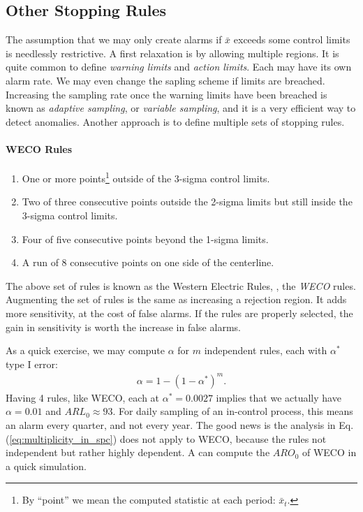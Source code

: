 \subsection{Other Stopping Rules}
\label{sec:stopping_rules}

The assumption that we may only create alarms if $\bar{x}$ exceeds some control limits is needlessly restrictive.
A first relaxation is by allowing multiple regions.
It is quite common to define \emph{warning limits} and \emph{action limits}. Each may have its own alarm rate.
We may even change the sapling scheme if limits are breached. Increasing the sampling rate once the warning limits have been breached is known as \emph{adaptive sampling}, or \emph{variable sampling}, and it is a very efficient way to detect anomalies. 
Another approach is to define multiple sets of stopping rules.
\begin{tcolorbox}[breakable]
\paragraph{WECO Rules}
\begin{enumerate}
\item One or more points\footnote{By ``point'' we mean the computed statistic at each period: $\bar{x}_t$.} outside of the 3-sigma control limits.
\item Two of three consecutive points outside the 2-sigma limits but still inside the 3-sigma control limits.
\item Four of five consecutive points beyond the 1-sigma limits.
\item A run of 8 consecutive points on one side of the centerline.
\end{enumerate}
\end{tcolorbox}

The above set of rules is known as the Western Electric Rules, \aka, the \emph{WECO} rules.
Augmenting the set of rules is the same as increasing a rejection region. It adds more sensitivity, at the cost of false alarms. If the rules are properly selected, the gain in sensitivity is worth the increase in false alarms.

As a quick exercise, we may compute $\alpha$  for $m$ independent rules, each with $\alpha^*$ type I error:
\begin{align}
\label{eq:multiplicity_in_spc}
	\alpha=1-(1-\alpha^*)^m.
\end{align}
Having 4 rules, like WECO, each at $\alpha^*=0.0027$ implies that we actually have $\alpha=0.01$ and $ARL_0 \approx 93$. For daily sampling of an in-control process, this means an alarm every quarter, and not every year. 
The good news is the analysis in Eq.(\ref{eq:multiplicity_in_spc}) does not apply to WECO, because the rules not independent but rather highly dependent. 
A can compute the $ARO_0$ of WECO in a quick simulation.

